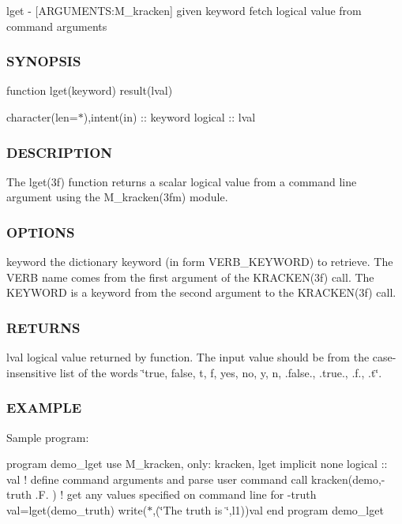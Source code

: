 lget -\/ \mbox{[}A\+R\+G\+U\+M\+E\+N\+TS\+:M\+\_\+kracken\mbox{]} given keyword fetch logical value from command arguments \subsubsection*{S\+Y\+N\+O\+P\+S\+IS}

function lget(keyword) result(lval)

character(len=$\ast$),intent(in) \+:\+: keyword logical \+:\+: lval \subsubsection*{D\+E\+S\+C\+R\+I\+P\+T\+I\+ON}

The lget(3f) function returns a scalar logical value from a command line argument using the M\+\_\+kracken(3fm) module.

\subsubsection*{O\+P\+T\+I\+O\+NS}

keyword the dictionary keyword (in form V\+E\+R\+B\+\_\+\+K\+E\+Y\+W\+O\+RD) to retrieve. The V\+E\+RB name comes from the first argument of the K\+R\+A\+C\+K\+E\+N(3f) call. The K\+E\+Y\+W\+O\+RD is a keyword from the second argument to the K\+R\+A\+C\+K\+E\+N(3f) call.

\subsubsection*{R\+E\+T\+U\+R\+NS}

lval logical value returned by function. The input value should be from the case-\/insensitive list of the words \char`\"{}true, false,
                t, f, yes, no, y, n, .\+false., .\+true., .\+f., .\+t\char`\"{}.

\subsubsection*{E\+X\+A\+M\+P\+LE}

Sample program\+:

program demo\+\_\+lget use M\+\_\+kracken, only\+: kracken, lget implicit none logical \+:\+: val ! define command arguments and parse user command call kracken(\textquotesingle{}demo\textquotesingle{},\textquotesingle{}-\/truth .F.\textquotesingle{} ) ! get any values specified on command line for -\/truth val=lget(\textquotesingle{}demo\+\_\+truth\textquotesingle{}) write($\ast$,\textquotesingle{}(\char`\"{}\+The truth is \char`\"{},l1)\textquotesingle{})val end program demo\+\_\+lget

